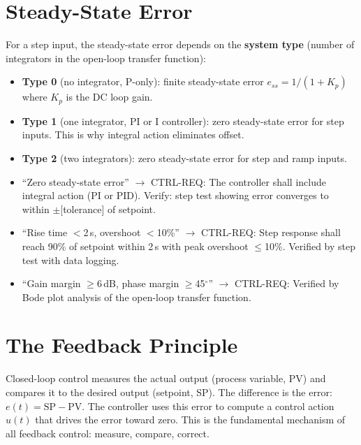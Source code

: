 \documentclass[11pt,letterpaper,twoside,openany]{book}
\providecommand{\ang}[1]{#1\ensuremath{{}^{\circ}}}
\begin{document}
\section{Steady-State Error}
For a step input, the steady-state error depends on the \textbf{system type} (number of integrators in the open-loop transfer function):
\begin{itemize}[nosep,leftmargin=1.5em]
\item \textbf{Type 0} (no integrator, P-only): finite steady-state error $e_{ss} = 1/(1 + K_p)$ where $K_p$ is the DC loop gain.
\item \textbf{Type 1} (one integrator, PI or I controller): zero steady-state error for step inputs. This is why integral action eliminates offset.
\item \textbf{Type 2} (two integrators): zero steady-state error for step and ramp inputs.
\end{itemize}

\begin{keyconceptbox}
\begin{itemize}[nosep,leftmargin=1.5em]
\item ``Zero steady-state error'' $\to$ CTRL-REQ: The controller shall include integral action (PI or PID). Verify: step test showing error converges to within $\pm$[tolerance] of setpoint.
\item ``Rise time $<$2\,s, overshoot $<$10\%'' $\to$ CTRL-REQ: Step response shall reach 90\% of setpoint within 2\,s with peak overshoot $\leq$10\%. Verified by step test with data logging.
\item ``Gain margin $\geq$6\,dB, phase margin $\geq$45\ang{}'' $\to$ CTRL-REQ: Verified by Bode plot analysis of the open-loop transfer function.
\end{itemize}
\end{keyconceptbox}


\section{The Feedback Principle}
Closed-loop control measures the actual output (process variable, PV) and compares it to the desired output (setpoint, SP). The difference is the error: $e(t) = \text{SP} - \text{PV}$. The controller uses this error to compute a control action $u(t)$ that drives the error toward zero. This is the fundamental mechanism of all feedback control: measure, compare, correct.
\end{document}
